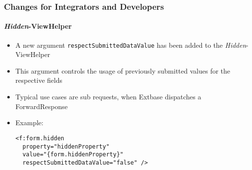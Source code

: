 %

\begin{frame}[fragile]
	\frametitle{Changes for Integrators and Developers}
	\framesubtitle{\textit{Hidden}-ViewHelper}


	\begin{itemize}
		\item A new argument \texttt{respectSubmittedDataValue} has been added
			to the \textit{Hidden}-ViewHelper
		\item This argument controls the usage of previously submitted values
			for the respective fields
		\item Typical use cases are sub requests, when Extbase dispatches a
			ForwardResponse

		\item Example:
\begin{lstlisting}
<f:form.hidden
  property="hiddenProperty"
  value="{form.hiddenProperty}"
  respectSubmittedDataValue="false" />
\end{lstlisting}

	\end{itemize}
\end{frame}

